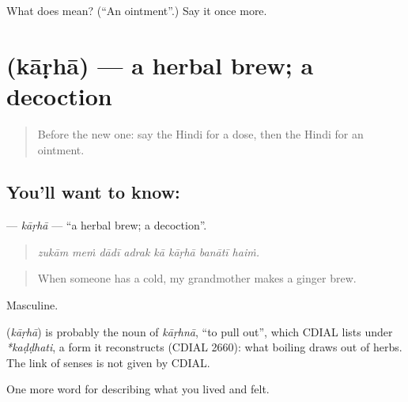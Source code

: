 \begin{tcolorbox}[breakable,colback=teal!4,colframe=teal!35!black,title={Before you move on}]
What does  mean? (\textquotedblleft{}An ointment\textquotedblright{}.) Say it once more.
\end{tcolorbox}
\section[\texorpdfstring{\hi{काढ़ा} (kāṛhā)}{काढ़ा (kāṛhā)}]{ (kāṛhā) — a herbal brew; a decoction}

\label{lesson:HI-C489-karha}



\begin{quote}
Before the new one: say the Hindi for a dose, then the Hindi for an ointment.
\end{quote}

\subsection*{You'll want to know: }
\textbf{} — \emph{kāṛhā} — \textquotedblleft{}a herbal brew; a decoction\textquotedblright{}.

\begin{quote}
       
\end{quote}

\begin{quote}
\emph{zukām meṁ dādī adrak kā kāṛhā banātī haiṁ.}
\end{quote}

\begin{quote}
When someone has a cold, my grandmother makes a ginger brew.
\end{quote}

Masculine.

\begin{cousinweb}
\textbf{} (\emph{kāṛhā}) is probably the noun of \emph{kāṛhnā}, \textquotedblleft{}to pull out\textquotedblright{}, which CDIAL lists under \emph{*kaḍḍhati}, a form it reconstructs (CDIAL 2660): what boiling draws out of herbs. The link of senses is not given by CDIAL.
\end{cousinweb}

\begin{grammarlens}[title={What you've built}]
One more word for describing what you lived and felt.
\end{grammarlens}

